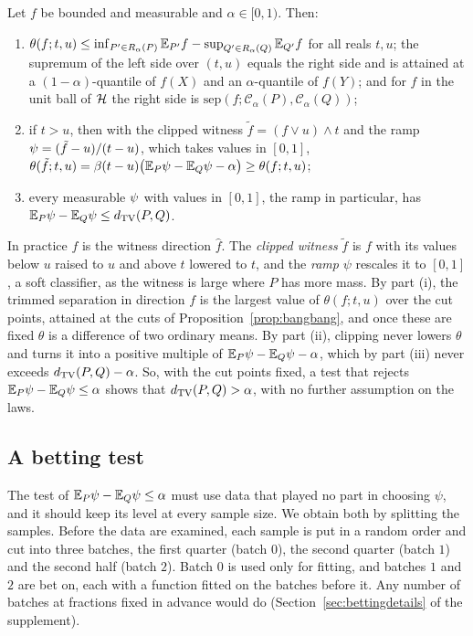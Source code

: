 \begin{lemma}
\label{lem:ramp}
Let $f$ be bounded and measurable and $\alpha\in[0,1)$. Then:
\begin{enumerate}[label=(\roman*),leftmargin=*]
\item $\theta(f;t,u)\le\inf_{P'\in R_\alpha(P)}\mathbb{E}_{P'}f-\sup_{Q'\in R_\alpha(Q)}\mathbb{E}_{Q'}f$ for all reals $t,u$; the
supremum of the left side over $(t,u)$ equals the right side and is attained at a $(1-\alpha)$-quantile of $f(X)$
and an $\alpha$-quantile of $f(Y)$; and for $f$ in the unit ball of $\mathcal{H}$ the right side is
$\mathrm{sep}(f;\mathcal C_\alpha(P),\mathcal C_\alpha(Q))$;
\item if $t>u$, then with the clipped witness $\tilde f=(f\vee u)\wedge t$ and the ramp $\psi=(\tilde f-u)/(t-u)$, which
takes values in $[0,1]$, $\theta(\tilde f;t,u)=\beta(t-u)\big(\mathbb{E}_P\psi-\mathbb{E}_Q\psi-\alpha\big)\ge\theta(f;t,u)$;
\item every measurable $\psi$ with values in $[0,1]$, the ramp in particular, has $\mathbb{E}_P\psi-\mathbb{E}_Q\psi\le d_{\mathrm{TV}}(P,Q)$.
\end{enumerate}
\end{lemma}

In practice $f$ is the witness direction $\widehat f$. The \emph{clipped witness} $\tilde f$ is $f$ with its values
below $u$ raised to $u$ and above $t$ lowered to $t$, and the \emph{ramp} $\psi$ rescales it to $[0,1]$, a soft
classifier, as the witness is large where $P$ has more mass. By part (i), the trimmed separation in direction $f$ is the
largest value of $\theta(f;t,u)$ over the cut points, attained at the cuts of Proposition~\ref{prop:bangbang}, and once
these are fixed $\theta$ is a difference of two ordinary means. By part (ii), clipping never lowers $\theta$ and turns
it into a positive multiple of $\mathbb{E}_P\psi-\mathbb{E}_Q\psi-\alpha$, which by part (iii) never exceeds $d_{\mathrm{TV}}(P,Q)-\alpha$. So,
with the cut points fixed, a test that rejects $\mathbb{E}_P\psi-\mathbb{E}_Q\psi\le\alpha$ shows that $d_{\mathrm{TV}}(P,Q)>\alpha$, with no
further assumption on the laws.

\subsection{A betting test}
\label{sec:betting}

The test of $\mathbb{E}_P\psi-\mathbb{E}_Q\psi\le\alpha$ must use data that played no part in choosing $\psi$, and it should keep its
level at every sample size. We obtain both by splitting the samples. Before the data are examined, each sample is put in
a random order and cut into three batches, the first quarter (batch $0$), the second quarter (batch $1$) and the second
half (batch $2$). Batch $0$ is used only for fitting, and
batches $1$ and $2$ are bet on, each with a function fitted on the batches before it. Any number of batches at fractions
fixed in advance would do (Section~\ref{sec:bettingdetails} of the supplement).

